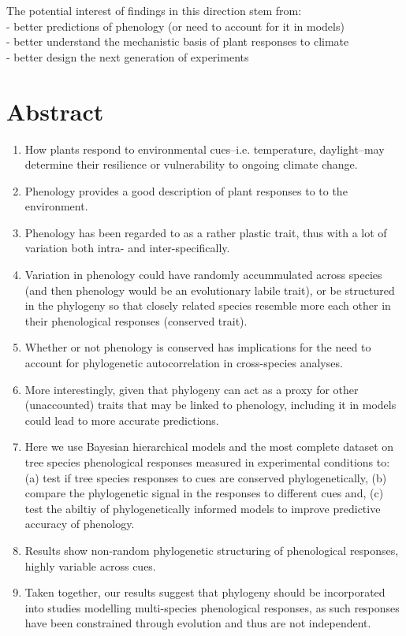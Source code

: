 \documentclass{article}\usepackage[]{graphicx}\usepackage[]{color}
\begin{document}
The potential interest of findings in this direction stem from:\\
- better predictions of phenology (or need to account for it in models)\\
- better understand the mechanistic basis of plant responses to climate\\
- better design the next generation of experiments \\


\section*{Abstract}
\begin{enumerate}
\item How plants respond to environmental cues--i.e. temperature, daylight--may determine their resilience or vulnerability to ongoing climate change. 
\item Phenology provides a good description of plant responses to to the environment. 
\item Phenology has been regarded to as a rather plastic trait, thus with a lot of variation both intra- and inter-specifically.
\item Variation in phenology could have randomly accummulated across species (and then phenology would be an evolutionary labile trait), or be structured in the phylogeny so that closely related species resemble more each other in their phenological responses (conserved trait).
\item Whether or not phenology is conserved has implications for the need to account for phylogenetic autocorrelation in cross-species analyses.
\item More interestingly, given that phylogeny can act as a proxy for other (unaccounted) traits that may be linked to phenology, including it in models could lead to more accurate predictions.
\item Here we use Bayesian hierarchical models and the most complete dataset on tree species phenological responses measured in experimental conditions to: (a) test if tree species responses to cues are conserved phylogenetically, (b) compare the phylogenetic signal in the responses to different cues and, (c) test the abiltiy of phylogenetically informed models to improve predictive accuracy of phenology.
\item Results show non-random phylogenetic structuring of phenological responses, highly variable across cues.  
\item Taken together, our results suggest that phylogeny should be incorporated into studies modelling multi-species phenological responses, as such responses have been constrained through evolution and thus are not independent.  
\end{enumerate}
\end{document}

